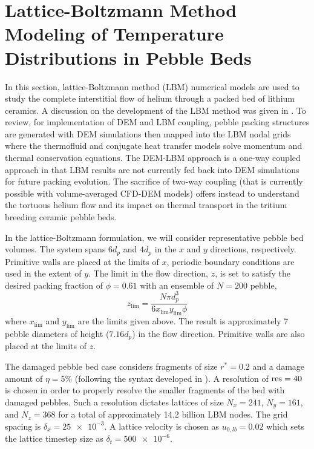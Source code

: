 \FloatBarrier
\section{Lattice-Boltzmann Method Modeling of Temperature Distributions in Pebble Beds}\label{sec:lbm-studies}
In this section, lattice-Boltzmann method (LBM) numerical models are used to study the complete interstitial flow of helium through a packed bed of lithium ceramics. A discussion on the development of the LBM method was given in . To review, for implementation of DEM and LBM coupling, pebble packing structures are generated with DEM simulations then mapped into the LBM nodal grids where the thermofluid and conjugate heat transfer models solve momentum and thermal conservation equations. The DEM-LBM approach is a one-way coupled approach in that LBM results are not currently fed back into DEM simulations for future packing evolution. The sacrifice of two-way coupling (that is currently possible with volume-averaged CFD-DEM models) offers instead to understand the tortuous helium flow and its impact on thermal transport in the tritium breeding ceramic pebble beds.

In the lattice-Boltzmann formulation, we will consider representative pebble bed volumes. The system spans $6d_p$ and $4d_p$ in the $x$ and $y$ directions, respectively. Primitive walls are placed at the limits of $x$, periodic boundary conditions are used in the extent of $y$. The limit in the flow direction, $z$, is set to satisfy the desired packing fraction of $\phi = 0.61$ with an ensemble of $N = 200$ pebble,
\begin{equation}
z_\text{lim} = \frac{N\pi d_p^3}{6x_\text{lim}y_\text{lim}\phi}
\end{equation}
where $x_\text{lim}$ and $y_\text{lim}$ are the limits given above. The result is approximately 7 pebble diameters of height ($7.16 d_p$) in the flow direction. Primitive walls are also placed at the limits of $z$.

The damaged pebble bed case considers fragments of size $r^* = 0.2$ and a damage amount of $\eta = 5\%$ (following the syntax developed in ). A resolution of $\text{res} = 40$ is chosen in order to properly resolve the smaller fragments of the bed with damaged pebbles. Such a resolution dictates lattices of size $N_x = 241$, $N_y = 161$, and $N_z = 368$ for a total of approximately 14.2 billion LBM nodes. The grid spacing is $\delta_x = \num{25e-3}$. A lattice velocity is chosen as $u_{0,lb} = 0.02$ which sets the lattice timestep size as $\delta_t = \num{500e-6}$. 

